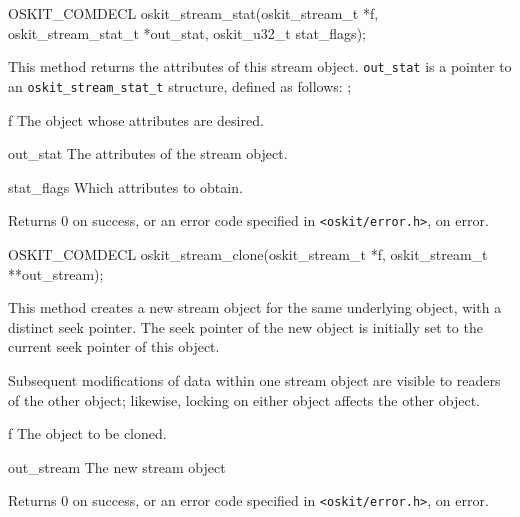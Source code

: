 \begin{apisyn}

	\funcproto OSKIT_COMDECL
	oskit_stream_stat(oskit_stream_t *f, 
			 \outparam oskit_stream_stat_t *out_stat, 
	                 oskit_u32_t stat_flags);
\end{apisyn}
\begin{apidesc}
	This method returns the attributes of this stream object.
	{\tt out_stat} is a pointer to an {\tt oskit_stream_stat_t}
	structure, defined as follows:
	;
\end{apidesc}
\begin{apiparm}
	\item[f]
		The object whose attributes are desired.
	\item[out_stat]
		The attributes of the stream object.
	\item[stat_flags]
		Which attributes to obtain.
\end{apiparm}
\begin{apiret}
	Returns 0 on success, or an error code specified in
	{\tt <oskit/error.h>}, on error.
\end{apiret}


\begin{apisyn}
	
	\funcproto OSKIT_COMDECL
	oskit_stream_clone(oskit_stream_t *f, 
			 \outparam oskit_stream_t **out_stream); 
\end{apisyn}
\begin{apidesc}
	This method creates a new stream object for the same
	underlying object, with a distinct seek pointer.  The
	seek pointer of the new object is initially set to
	the current seek pointer of this object.  
	
	Subsequent modifications of data within one stream
	object are visible to readers of the other object;
	likewise, locking on either object affects the
	other object.
\end{apidesc}
\begin{apiparm}
	\item[f]
		The object to be cloned.
	\item[out_stream]
		The new stream object
\end{apiparm}
\begin{apiret}
	Returns 0 on success, or an error code specified in
	{\tt <oskit/error.h>}, on error.
\end{apiret}

